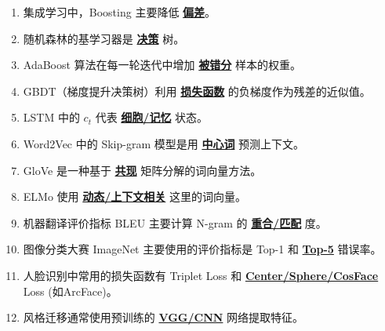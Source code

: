 \documentclass[12pt,a4paper,openany]{ctexbook}
\begin{document}
\begin{enumerate}[resume,leftmargin=2em,itemsep=1pt]
\item 集成学习中，Boosting 主要降低 \underline{\textbf{偏差}}。
\item 随机森林的基学习器是 \underline{\textbf{决策}} 树。
\item AdaBoost 算法在每一轮迭代中增加 \underline{\textbf{被错分}} 样本的权重。
\item GBDT（梯度提升决策树）利用 \underline{\textbf{损失函数}} 的负梯度作为残差的近似值。
\item LSTM 中的 $c_t$ 代表 \underline{\textbf{细胞/记忆}} 状态。
\item Word2Vec 中的 Skip-gram 模型是用 \underline{\textbf{中心词}} 预测上下文。
\item GloVe 是一种基于 \underline{\textbf{共现}} 矩阵分解的词向量方法。
\item ELMo 使用 \underline{\textbf{动态/上下文相关}} 这里的词向量。
\item 机器翻译评价指标 BLEU 主要计算 N-gram 的 \underline{\textbf{重合/匹配}} 度。
\item 图像分类大赛 ImageNet 主要使用的评价指标是 Top-1 和 \underline{\textbf{Top-5}} 错误率。
\item 人脸识别中常用的损失函数有 Triplet Loss 和 \underline{\textbf{Center/Sphere/CosFace}} Loss (如ArcFace)。
\item 风格迁移通常使用预训练的 \underline{\textbf{VGG/CNN}} 网络提取特征。
\end{enumerate}
\end{document}
